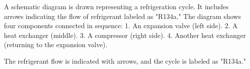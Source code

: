 A schematic diagram is drawn representing a refrigeration cycle. It includes arrows indicating the flow of refrigerant labeled as "R134a." The diagram shows four components connected in sequence:  
1. An expansion valve (left side).  
2. A heat exchanger (middle).  
3. A compressor (right side).  
4. Another heat exchanger (returning to the expansion valve).  

The refrigerant flow is indicated with arrows, and the cycle is labeled as "R134a."